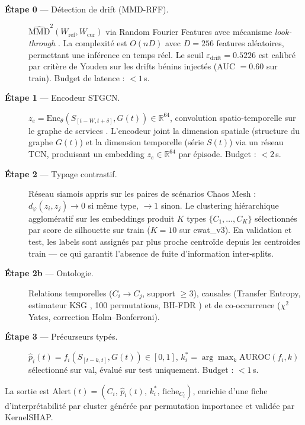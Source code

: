 \begin{description}
  \item[\textbf{Étape 0} --- Détection de drift (MMD-RFF).]
    $\widehat{\text{MMD}}^2(W_\text{ref}, W_\text{cur})$ via Random Fourier Features
    avec mécanisme \emph{look-through} \cite{hinder2024}.
    La complexité est $O(nD)$ avec $D = 256$ features aléatoires, permettant une inférence
    en temps réel. Le seuil $\varepsilon_\text{drift} = 0.5226$ est calibré par critère
    de Youden sur les drifts bénins injectés (AUC $= 0.60$ sur train).
    Budget de latence : $< 1$\,s.

  \item[\textbf{Étape 1} --- Encodeur STGCN.]
    $z_e = \text{Enc}_\theta(S_{[t-W,t+\delta]}, G(t)) \in \mathbb{R}^{64}$,
    convolution spatio-temporelle sur le graphe de services \cite{yu2018}.
    L'encodeur joint la dimension spatiale (structure du graphe $G(t)$) et la dimension
    temporelle (série $S(t)$) via un réseau TCN, produisant un embedding
    $z_e \in \mathbb{R}^{64}$ par épisode.
    Budget : $< 2$\,s.

  \item[\textbf{Étape 2} --- Typage contrastif.]
    Réseau siamois appris sur les paires de scénarios Chaos Mesh :
    $d_\varphi(z_i, z_j) \to 0$ si même type, $\to 1$ sinon.
    Le clustering hiérarchique agglomératif sur les embeddings produit
    $K$ types $\{C_1, \ldots, C_K\}$ sélectionnés par score de silhouette sur train
    ($K = 10$ sur ewat\_v3).
    En validation et test, les labels sont assignés par plus proche centroïde depuis les
    centroides train --- ce qui garantit l'absence de fuite d'information inter-splits.

  \item[\textbf{Étape 2b} --- Ontologie.]
    Relations temporelles ($C_i \to C_j$, support $\geq 3$),
    causales (Transfer Entropy, estimateur KSG \cite{kraskov2004},
    100 permutations, BH-FDR \cite{benjamini1995})
    et de co-occurrence ($\chi^2$ Yates, correction Holm--Bonferroni).

  \item[\textbf{Étape 3} --- Précurseurs typés.]
    $\hat{p}_i(t) = f_i(S_{[t-k,t]}, G(t)) \in [0,1]$,
    $k^*_i = \arg\max_k \text{AUROC}(f_i, k)$ sélectionné sur val,
    évalué sur test uniquement.
    Budget : $< 1$\,s.
\end{description}

La sortie est $\text{Alert}(t) = (C_i,\, \hat{p}_i(t),\, k^*_i,\, \text{fiche}_{C_i})$,
enrichie d'une fiche d'interprétabilité par cluster générée par permutation importance
et validée par KernelSHAP.

